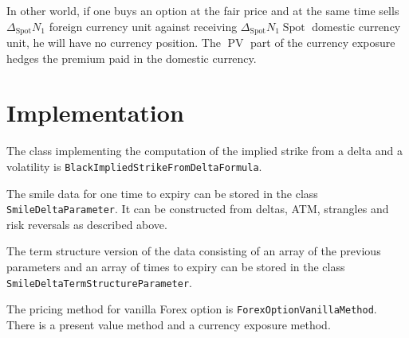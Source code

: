 \documentclass[]{amsart}
\newcommand{\class}[1]{{\texttt{#1}}}
\newcommand{\spot}{{\operatorname{Spot}}}
\newcommand{\pv}{{\operatorname{PV}}}
\begin{document}
In other world, if one buys an option at the fair price and at the same time sells $\Delta_\spot N_1$ foreign currency unit against receiving $\Delta_\spot N_1 \spot$ domestic currency unit, he will have no currency position. The $\pv$ part of the currency exposure hedges the premium paid in the domestic currency.

\section{Implementation}

The class implementing the computation of the implied strike from a delta and a volatility is
\class{BlackImpliedStrikeFromDeltaFormula}.

The smile data for one time to expiry can be stored in the class
\class{SmileDeltaParameter}. It can be constructed from deltas, ATM, strangles and risk reversals as described above.

The term structure version of the data consisting of an array of the previous parameters and an array of times to expiry can be stored in the class
\class{SmileDeltaTermStructureParameter}.

The pricing method for vanilla Forex option is \class{ForexOptionVanillaMethod}. There is a present value method and a currency exposure method.




\tableofcontents
\end{document}
